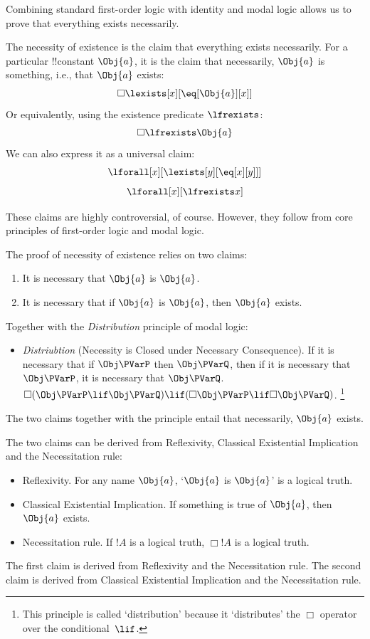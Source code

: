 \documentclass[../../../include/open-logic-section]{subfiles}
\begin{document}


Combining standard first-order logic with identity and modal logic 
allows us to prove that everything exists necessarily. 

\begin{defn} The necessity of existence is
    the claim that everything exists necessarily. For a particular
    !!{constant} $\Obj{a}$, it is the claim that necessarily, $\Obj{a}$ is something,
    i.e., that $\Obj{a}$ exists:
    $$\Box\lexists[x][\eq[\Obj{a}][x]]$$
    Or equivalently, using the existence predicate $\lfrexists$:
    $$\Box\lfrexists \Obj{a}$$
    We can also express it as a universal claim:
    $$\lforall[x][\lexists[y][\eq[x][y]]]$$
    $$\lforall[x][\lfrexists x]$$
\end{defn}

These claims are highly controversial, of course. However, they follow
from core principles of first-order logic and modal logic. 

The proof of necessity of existence relies on two claims:
\begin{enumerate}
    \item It is necessary that $\Obj{a}$ is $\Obj{a}$. 
    \item It is necessary that if $\Obj{a}$ is $\Obj{a}$, then $\Obj{a}$ exists. 
\end{enumerate}
Together with the \emph{Distribution} principle of modal logic:
\begin{itemize}
\item \emph{Distriubtion} (Necessity is Closed under Necessary Consequence).
If it is necessary that if $\Obj \PVarP$ then $\Obj \PVarQ$, then if 
it is necessary that $\Obj \PVarP$, it is necessary that $\Obj \PVarQ$.\\
$\Box(\Obj \PVarP\lif \Obj \PVarQ)\lif (\Box\Obj \PVarP\lif\Box\Obj \PVarQ)$.
\footnote{This principle is called `distribution' because it `distributes'
the $\Box$ operator over the conditional~$\lif$.}
\end{itemize}
The two claims together with the principle entail that necessarily,
$\Obj{a}$ exists. 

The two claims can be derived from Reflexivity, Classical Existential
Implication and the Necessitation rule: 
\begin{itemize}
    \item Reflexivity. For any name $\Obj{a}$, `$\Obj{a}$ is $\Obj{a}$' is a logical truth.
    \item Classical Existential Implication. If something is true of $\Obj{a}$, then $\Obj{a}$ exists.
    \item Necessitation rule. If $!A$ is a logical truth, $\Box!A$ is
    a logical truth.
\end{itemize}
The first claim is derived from Reflexivity and the Necessitation
rule. The second claim is derived from Classical Existential
Implication and the Necessitation rule. 
\end{document}
